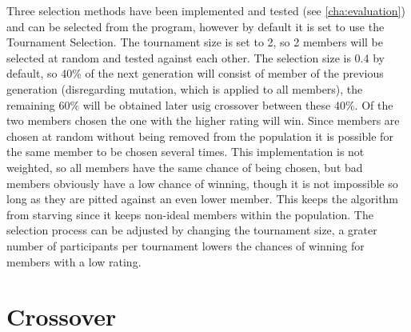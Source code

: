 Three selection methods have been implemented and tested (see \ref{cha:evaluation}) and can be selected from the program, however by default it is set to use the Tournament Selection. The tournament size is set to 2, so 2 members will be selected at random and tested against each other. The selection size is 0.4 by default, so 40\% of the next generation will consist of member of the previous generation (disregarding mutation, which is applied to all members), the remaining 60\% will be obtained later usig crossover between these 40\%. Of the two members chosen the one with the higher rating will win. Since members are chosen at random without being removed from the population it is possible for the same member to be chosen several times. This implementation is not weighted, so all members have the same chance of being chosen, but bad members obviously have a low chance of winning, though it is not impossible so long as they are pitted against an even lower member. This keeps the algorithm from starving since it keeps non-ideal members within the population. The selection process can be adjusted by changing the tournament size, a grater number of participants per tournament lowers the chances of winning for members with a low rating.

\section{Crossover} %
\label{sec:crossover}

